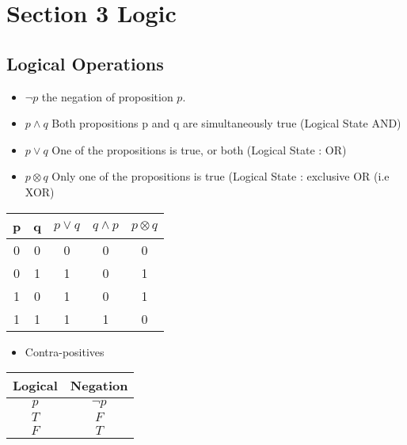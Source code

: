 
\section{Section 3 Logic}
\subsection{Logical Operations}
\begin{itemize}
\item $\neg p$ the negation of proposition $p$.
\item $p \wedge q$ Both propositions p and q are simultaneously true (Logical State AND)
\item $p \vee q $ One of the propositions is true, or both (Logical State : OR)
\item $p \otimes q$ Only one of the propositions is true (Logical State : exclusive OR (i.e XOR)
\end{itemize}
\begin{center}
\begin{tabular}{|c|c|c|c|c|}
\hline
p & q & $p \vee q$ & $q \wedge p$ & $p \otimes q$ \\
\hline
0 & 0 & 0 & 0 & 0 \\
0 & 1 & 1 & 0 & 1\\
1 & 0 & 1 & 0 & 1 \\
1 & 1 & 1 & 1 & 0\\
\hline
\end{tabular}
\end{center}






\begin{itemize}
	\item Contra-positives
\end{itemize}



\begin{center}
	\begin{tabular}{|c|c|}
		Logical & Negation \\ \hline
		$p$	& $\neg p$ \\ \hline
		$T$	& $F$      \\ \hline
		$F$	& $T$      \\ \hline
	\end{tabular}
\end{center}


